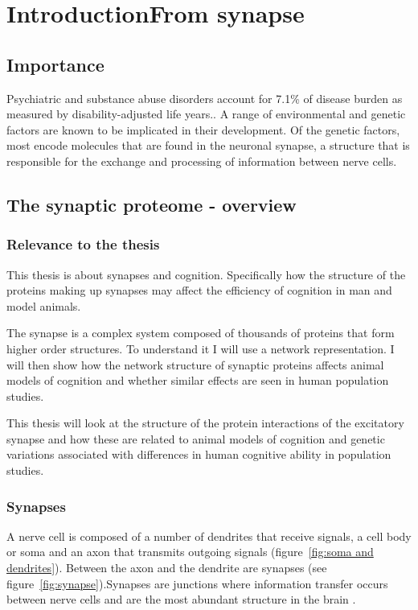 \chapter{IntroductionFrom  synapse}

\section{Importance}

Psychiatric and substance abuse disorders account for 7.1\% of disease burden as measured by disability-adjusted life years.\cite{murray2015global}.   A range of environmental and genetic factors are known to be implicated in their development. Of the genetic factors, most encode molecules that are found in the neuronal synapse, a structure that is responsible for the exchange and processing of information between nerve cells.

\section{The synaptic proteome - overview}

\subsection{Relevance to the thesis}
This thesis is about synapses and cognition. Specifically how the structure of the proteins making up synapses may affect the efficiency of cognition in man and model animals. 

The synapse is a complex system composed of thousands of proteins that form higher order structures.\cite{grant2012synaptopathies} To understand it I will use a network representation. I will then show how the network structure of synaptic proteins affects animal models of cognition and whether similar effects are seen in human population studies. 

This thesis will look at the structure of the protein interactions of the excitatory synapse and how these are related to animal models of cognition and genetic variations associated with differences in human cognitive ability in population studies.

\subsection{Synapses}
A nerve cell is composed of a number of dendrites that receive signals, a cell body or soma and an axon that transmits outgoing signals (figure~\ref{fig:soma and dendrites}). Between the axon and the dendrite are synapses (see figure~\ref{fig:synapse}).Synapses are junctions where information transfer occurs between nerve cells and are the most abundant structure in the brain \cite{grant2012synaptopathies}.

